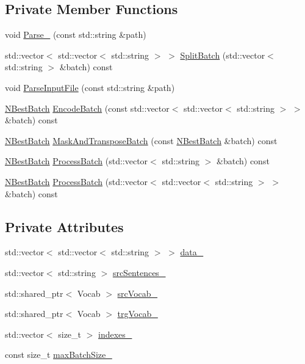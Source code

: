 \subsection*{Private Member Functions}
\begin{DoxyCompactItemize}
\item 
void \hyperlink{classNBest_aab4853101e05435c3df0a4380d260c8c}{Parse\+\_\+} (const std\+::string \&path)
\item 
std\+::vector$<$ std\+::vector$<$ std\+::string $>$ $>$ \hyperlink{classNBest_ad73a4cae337bf293c451dbebc329ddca}{Split\+Batch} (std\+::vector$<$ std\+::string $>$ \&batch) const 
\item 
void \hyperlink{classNBest_a2215cf0548472839f871608bbd28aad7}{Parse\+Input\+File} (const std\+::string \&path)
\item 
\hyperlink{nbest_8h_acb6b6f07cf7c4a3fe5820acf1a965584}{N\+Best\+Batch} \hyperlink{classNBest_a233054c9107f4f6d65afb09365f32f34}{Encode\+Batch} (const std\+::vector$<$ std\+::vector$<$ std\+::string $>$ $>$ \&batch) const 
\item 
\hyperlink{nbest_8h_acb6b6f07cf7c4a3fe5820acf1a965584}{N\+Best\+Batch} \hyperlink{classNBest_aacbc43e7c51dda0483afa71532f05986}{Mask\+And\+Transpose\+Batch} (const \hyperlink{nbest_8h_acb6b6f07cf7c4a3fe5820acf1a965584}{N\+Best\+Batch} \&batch) const 
\item 
\hyperlink{nbest_8h_acb6b6f07cf7c4a3fe5820acf1a965584}{N\+Best\+Batch} \hyperlink{classNBest_ae5410268f7e233ae0eafd6b4514cd559}{Process\+Batch} (std\+::vector$<$ std\+::string $>$ \&batch) const 
\item 
\hyperlink{nbest_8h_acb6b6f07cf7c4a3fe5820acf1a965584}{N\+Best\+Batch} \hyperlink{classNBest_aeca5858d89c32f38009f339a29547433}{Process\+Batch} (std\+::vector$<$ std\+::vector$<$ std\+::string $>$ $>$ \&batch) const 
\end{DoxyCompactItemize}
\subsection*{Private Attributes}
\begin{DoxyCompactItemize}
\item 
std\+::vector$<$ std\+::vector$<$ std\+::string $>$ $>$ \hyperlink{classNBest_a9e529e61d4f4c35ae7c299f367a43476}{data\+\_\+}
\item 
std\+::vector$<$ std\+::string $>$ \hyperlink{classNBest_a40c6af9a533bd2a7bb440d0aae299021}{src\+Sentences\+\_\+}
\item 
std\+::shared\+\_\+ptr$<$ Vocab $>$ \hyperlink{classNBest_a224740f4ca49e8e7afedac7bef6e4e1e}{src\+Vocab\+\_\+}
\item 
std\+::shared\+\_\+ptr$<$ Vocab $>$ \hyperlink{classNBest_acdbc9f2515ebc4c7b05b4955895e1392}{trg\+Vocab\+\_\+}
\item 
std\+::vector$<$ size\+\_\+t $>$ \hyperlink{classNBest_abfdeb2e459761468c673161c5a9377a4}{indexes\+\_\+}
\item 
const size\+\_\+t \hyperlink{classNBest_ab2110b8e8664578b3b4c4857c9a58cca}{max\+Batch\+Size\+\_\+}
\end{DoxyCompactItemize}


